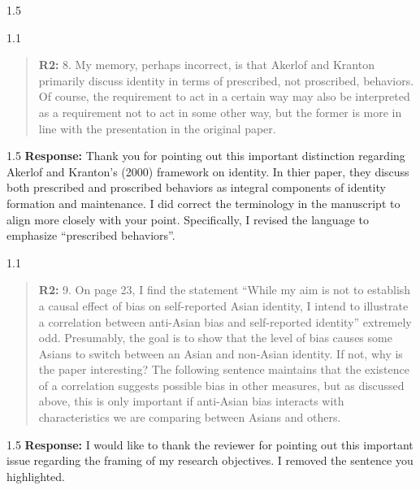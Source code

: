 \documentclass[12pt,english]{article}
\newcommand{\rrquote}{1.1}
\newcommand{\rrxspc}{1.5}
\begin{document}
\begin{refsection}
\begin{spacing}{\rrxspc}
    \end{spacing}

    \begin{spacing}{\rrquote}
        \begin{quotation}
        \textbf{R2: } 8. My memory, perhaps incorrect, is that Akerlof and Kranton primarily discuss identity in terms of prescribed, not proscribed, behaviors. Of course, the requirement to act in a certain way may also be interpreted as a requirement not to act in some other way, but the former is more in line with the presentation in the original paper.
        \end{quotation}
        \end{spacing}
        
        \begin{spacing}{\rrxspc}
           \textbf{Response:} Thank you for pointing out this important distinction regarding Akerlof and Kranton's (2000) framework on identity. In thier paper, they discuss both prescribed and proscribed behaviors as integral components of identity formation and maintenance. I did correct the terminology in the manuscript to align more closely with your point. Specifically, I revised the language to emphasize ``prescribed behaviors''. 
    \end{spacing}

    \begin{spacing}{\rrquote}
        \begin{quotation}
        \textbf{R2: } 9. On page 23, I find the statement “While my aim is not to establish a causal effect of bias on self-reported Asian identity, I intend to illustrate a correlation between anti-Asian bias and self-reported identity” extremely odd. Presumably, the goal is to show that the level of bias causes some Asians to switch between an Asian and non-Asian identity. If not, why is the paper interesting? The following sentence maintains that the existence of a correlation suggests possible bias in other measures, but as discussed above, this is only important if anti-Asian bias interacts with characteristics we are comparing between Asians and others.
        \end{quotation}
        \end{spacing}
        
        \begin{spacing}{\rrxspc}
           \textbf{Response:} I would like to thank the reviewer for pointing out this important issue regarding the framing of my research objectives. I removed the sentence you highlighted.
    \end{spacing}


\end{refsection}
\end{document}
